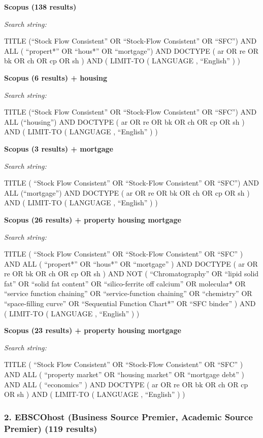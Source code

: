 \documentclass[
]{book}
\begin{document}
\textbf{Scopus (138 results)}

\emph{Search string:}

TITLE (``Stock Flow Consistent'' OR ``Stock-Flow Consistent'' OR ``SFC'') AND ALL ( ``propert*'' OR ``hous*'' OR ``mortgage'') AND DOCTYPE ( ar OR re OR bk OR ch OR cp OR sh ) AND ( LIMIT-TO ( LANGUAGE , ``English'' ) )

\textbf{Scopus (6 results) + housing}

\emph{Search string:}

TITLE (``Stock Flow Consistent'' OR ``Stock-Flow Consistent'' OR ``SFC'') AND ALL (``housing'') AND DOCTYPE ( ar OR re OR bk OR ch OR cp OR sh ) AND ( LIMIT-TO ( LANGUAGE , ``English'' ) )

\textbf{Scopus (3 results) + mortgage}

\emph{Search string:}

TITLE ( ``Stock Flow Consistent'' OR ``Stock-Flow Consistent'' OR ``SFC'') AND ALL (``mortgage'') AND DOCTYPE ( ar OR re OR bk OR ch OR cp OR sh ) AND ( LIMIT-TO ( LANGUAGE , ``English'' ) )

\textbf{Scopus (26 results) + property housing mortgage}

\emph{Search string:}

TITLE ( ``Stock Flow Consistent'' OR ``Stock-Flow Consistent'' OR ``SFC'' ) AND ALL ( ``propert*'' OR ``hous*'' OR ``mortgage'' ) AND DOCTYPE ( ar OR re OR bk OR ch OR cp OR sh ) AND NOT ( ``Chromatography'' OR ``lipid solid fat'' OR ``solid fat content'' OR ``silico-ferrite off calcium'' OR molecular* OR ``service function chaining'' OR ``service-function chaining'' OR ``chemistry'' OR ``space-filling curve'' OR ``Sequential Function Chart*'' OR ``SFC binder'' ) AND ( LIMIT-TO ( LANGUAGE , ``English'' ) )

\textbf{Scopus (23 results) + property housing mortgage}

\emph{Search string:}

TITLE ( ``Stock Flow Consistent'' OR ``Stock-Flow Consistent'' OR ``SFC'' ) AND ALL ( ``property market'' OR ``housing market'' OR ``mortgage debt'' ) AND ALL ( ``economics'' ) AND DOCTYPE ( ar OR re OR bk OR ch OR cp OR sh ) AND ( LIMIT-TO ( LANGUAGE , ``English'' ) )

\hypertarget{ebscohost-business-source-premier-academic-source-premier-119-results}{%
\subsubsection{2. EBSCOhost (Business Source Premier, Academic Source Premier) (119 results)}\label{ebscohost-business-source-premier-academic-source-premier-119-results}}
\end{document}
